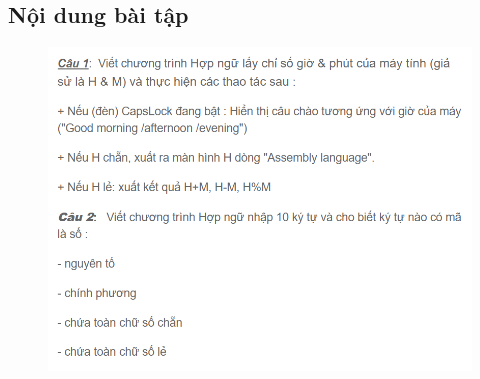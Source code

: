 \documentclass[12pt, a4paper]{article}
\begin{document}
\subsection{Nội dung bài tập}
\begin{figure}[H]
    \begin{center}
        \includegraphics[scale = 1]{Topic.png}
    \end{center}
\end{figure}
\newpage
\end{document}
